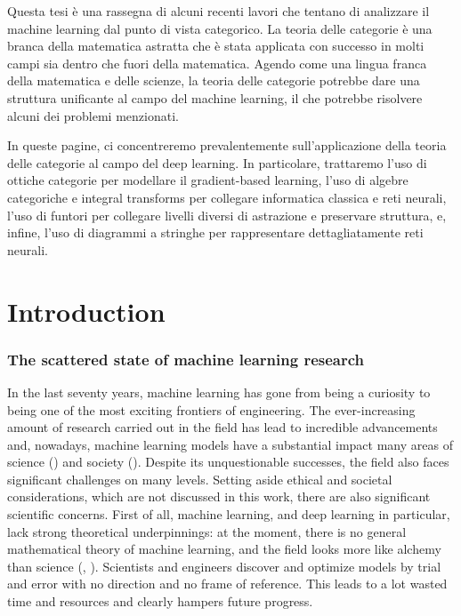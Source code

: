 \documentclass[11pt,a4paper,openright,twoside]{report}
\theoremstyle{plain}
\theoremstyle{definition}
\begin{document}
Questa tesi è una rassegna di alcuni recenti lavori che tentano di analizzare il machine learning dal punto di vista categorico. La teoria delle categorie è una branca della matematica astratta che è stata applicata con successo in molti campi sia dentro che fuori della matematica. Agendo come una lingua franca della matematica e delle scienze, la teoria delle categorie potrebbe dare una struttura unificante al campo del machine learning, il che potrebbe risolvere alcuni dei problemi menzionati.

In queste pagine, ci concentreremo prevalentemente sull'applicazione della teoria delle categorie al campo del deep learning. In particolare, trattaremo l'uso di ottiche categorie per modellare il gradient-based learning, l'uso di algebre categoriche e integral transforms per collegare informatica classica e reti neurali, l'uso di funtori per collegare livelli diversi di astrazione e preservare struttura, e, infine, l'uso di diagrammi a stringhe per rappresentare dettagliatamente reti neurali.

\clearpage{\pagestyle{empty}\cleardoublepage}



\chapter*{Introduction}   

\subsection*{The scattered state of machine learning research}

In the last seventy years, machine learning has gone from being a curiosity to being one of the most exciting frontiers of engineering. The ever-increasing amount of research carried out in the field has lead to incredible advancements and, nowadays, machine learning models have a substantial impact many areas of science (\cite{hajkowicz2023artificial}) and society (\cite{khogali2023blended}). Despite its unquestionable successes, the field also faces significant challenges on many levels. Setting aside ethical and societal considerations, which are not discussed in this work, there are also significant scientific concerns. First of all, machine learning, and deep learning in particular, lack strong theoretical underpinnings: at the moment, there is no general mathematical theory of machine learning, and the field looks more like alchemy than science (\cite{gavranovic2024fundamental}, \cite{rahimi2017machine}). Scientists and engineers discover and optimize models by trial and error with no direction and no frame of reference. This leads to a lot wasted time and resources and clearly hampers future progress.
\end{document}
